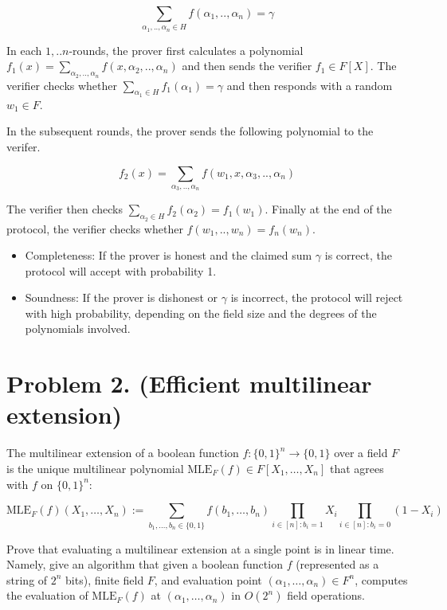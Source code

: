 \documentclass{article}
\begin{document}
$$
\sum_{\alpha_{1},..,\alpha_{n}\in H} f(\alpha_{1},..,\alpha_{n}) = \gamma
$$

In each $1,..n$-rounds, the prover first calculates a polynomial $f_{1}(x)= \sum_{\alpha_{2},..,\alpha_{n}}f(x, \alpha_{2},..,\alpha_{{n}})$ and then sends the verifier $f_{1} \in F[X]$. The verifier checks whether $\sum_{\alpha_{1}\in H}f_{1}(\alpha_{1})=\gamma$ and then responds with a random $w_{1} \in F$.


In the subsequent rounds, the prover sends the following polynomial to the verifer.

$$
f_{2}(x)= \sum_{\alpha_{3},..,\alpha_{n}}f(w_{1}, x ,\alpha_{3},..,\alpha_{{n}})
$$

The verifier then checks $\sum_{\alpha_{2}\in H}f_{2}(\alpha_{2}) = f_{1}(w_{1})$.  Finally at the end of the protocol, the verifier checks whether $f(w_{1},..,w_{n}) = f_{n}(w_{n})$.

\begin{itemize}
        \item Completeness: If the prover is honest and the claimed sum
$\gamma$ is correct, the protocol will accept with probability 1.
        \item Soundness: If the prover is dishonest or $\gamma$ is incorrect, the protocol will reject with high probability, depending on the field size and the degrees of the polynomials involved.
\end{itemize}

\section*{Problem 2. (Efficient multilinear extension)}

The multilinear extension of a boolean function $f : \{0, 1\}^n \rightarrow \{0, 1\}$ over a field $F$ is the unique multilinear polynomial $\mathrm{MLE}_F(f) \in F[X_1, \ldots, X_n]$ that agrees with $f$ on $\{0, 1\}^n$:

\[
\mathrm{MLE}_F(f)(X_1, \ldots, X_n) := \sum_{b_1,\ldots,b_n \in \{0,1\}} f(b_1, \ldots, b_n) \prod_{i\in[n]:b_i=1} X_i \prod_{i\in[n]:b_i=0} (1 - X_i)
\]

Prove that evaluating a multilinear extension at a single point is in linear time. Namely, give an algorithm that given a boolean function $f$ (represented as a string of $2^n$ bits), finite field $F$, and evaluation point $(\alpha_1, \ldots, \alpha_n) \in F^n$, computes the evaluation of $\mathrm{MLE}_F(f)$ at $(\alpha_1, \ldots, \alpha_n)$ in $O(2^n)$ field operations.
\end{document}
